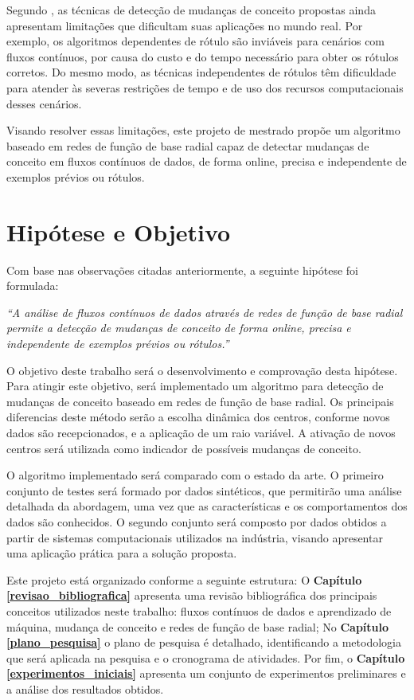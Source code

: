 \documentclass[qual, classic, a4paper]{ufbathesis}
\begin{document}
Segundo \cite{Aggarwal:2006:DSM:1196418, Gama:2014:SCD:2597757.2523813},
as técnicas de detecção de mudanças de conceito propostas ainda apresentam limitações que dificultam suas aplicações no mundo real.
% 
Por exemplo, os algoritmos dependentes de rótulo são inviáveis para cenários com fluxos contínuos, por causa do custo e do tempo necessário para obter os rótulos corretos.
%
Do mesmo modo, as técnicas independentes de rótulos têm dificuldade para atender às severas restrições de tempo e de uso dos recursos computacionais desses cenários.

Visando resolver essas limitações, 
este projeto de mestrado propõe um algoritmo baseado em redes de função de base radial capaz de detectar mudanças de conceito em fluxos contínuos de dados, 
de forma online, 
precisa e independente de exemplos prévios ou rótulos.

\section{Hipótese e Objetivo}

Com base nas observações citadas anteriormente, a seguinte hipótese foi formulada:

\begin{center}
\textit{``A análise de fluxos contínuos de dados através de redes de função de base radial permite a detecção de mudanças de conceito de forma online, precisa e independente de exemplos prévios ou rótulos.''}
\end{center}

O objetivo deste trabalho será o desenvolvimento e comprovação desta hipótese.
Para atingir este objetivo, será implementado um algoritmo para detecção de mudanças de conceito baseado em redes de função de base radial. 
Os principais diferencias deste método serão a escolha dinâmica dos centros, conforme novos dados são recepcionados, e a aplicação de um raio variável.
A ativação de novos centros será utilizada como indicador de possíveis mudanças de conceito.

O algoritmo implementado será comparado com o estado da arte. 
O primeiro conjunto de testes será formado por dados sintéticos, que permitirão uma análise detalhada da abordagem, uma vez que as características e os comportamentos dos dados são conhecidos. 
O segundo conjunto será composto por dados obtidos a partir de sistemas computacionais utilizados na indústria,
visando apresentar uma aplicação prática para a solução proposta. 

Este projeto está organizado conforme a seguinte estrutura: 
O \textbf{Capítulo \ref{revisao_bibliografica}} apresenta uma revisão bibliográfica dos principais conceitos utilizados neste trabalho: fluxos contínuos de dados e aprendizado de máquina, mudança de conceito e redes de função de base radial; 
No \textbf{Capítulo \ref{plano_pesquisa}} o plano de pesquisa é detalhado, 
identificando a metodologia que será aplicada na pesquisa e o cronograma de atividades. 
Por fim, o \textbf{Capítulo \ref{experimentos_iniciais}} 
apresenta um conjunto de experimentos preliminares e a análise dos resultados obtidos.
\end{document}
